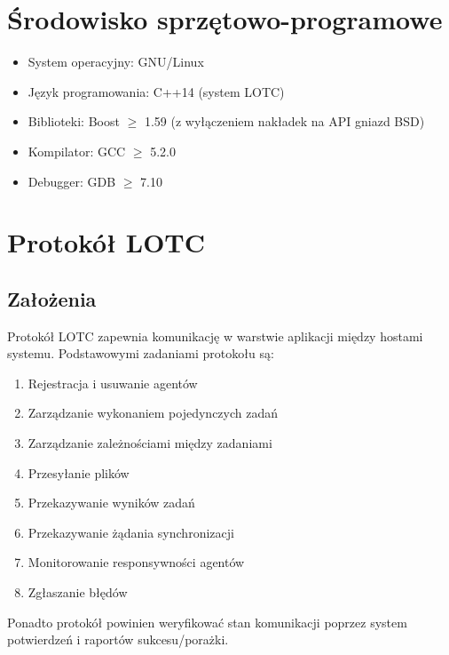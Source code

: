\documentclass[10pt,a4paper]{article}
\begin{document}
		    \begin{figure}[H]
				\def\svgwidth{\columnwidth}
				
			\end{figure}
				
	\section{Środowisko sprzętowo-programowe}
	
	    \begin{itemize}   
			\item System operacyjny: GNU/Linux
			\item Język programowania: C++14 (system LOTC)
		    \item Biblioteki: Boost $ \geqslant $ 1.59 (z wyłączeniem nakładek na API gniazd BSD)
			\item Kompilator: GCC $ \geqslant $ 5.2.0
			\item Debugger: GDB $ \geqslant $ 7.10
	    \end{itemize}
	    
    \section{Protokół LOTC}
        \subsection{Założenia}
	        Protokół LOTC zapewnia komunikację w warstwie aplikacji między hostami systemu. Podstawowymi zadaniami protokołu są:
	        
	        \begin{enumerate}
				\item Rejestracja i usuwanie agentów
				\item Zarządzanie wykonaniem pojedynczych zadań
				\item Zarządzanie zależnościami między zadaniami
			    \item Przesyłanie plików
				\item Przekazywanie wyników zadań
				\item Przekazywanie żądania synchronizacji
				\item Monitorowanie responsywności agentów
				\item Zgłaszanie błędów
		    \end{enumerate}
		    
		    Ponadto protokół powinien weryfikować stan komunikacji poprzez system potwierdzeń i raportów sukcesu/porażki.
		    
\end{document}

